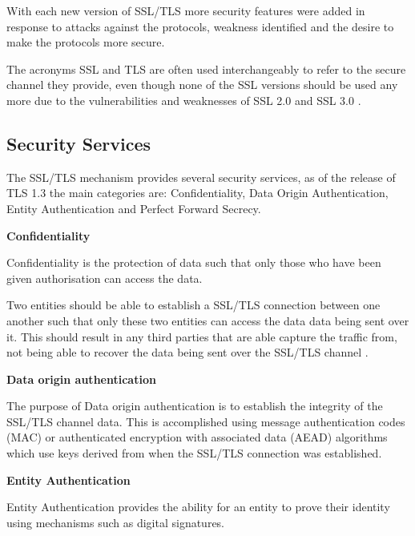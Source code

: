 \documentclass{mscreport}
\begin{document}
\vspace{0.3cm} \noindent
With each new version of SSL/TLS more security features were added in response to attacks against the protocols, weakness identified and the desire to make the protocols more secure.

\vspace{0.3cm} \noindent
The acronyms SSL and TLS are often used interchangeably to refer to the secure channel they provide, even though none of the SSL versions should be used any more due to the vulnerabilities and weaknesses of SSL 2.0 and SSL 3.0 \cite{Oppliger2016-ig}.

\subsection{Security Services}
\noindent The SSL/TLS mechanism provides several security services, as of the release of TLS 1.3 the main categories are: Confidentiality, Data Origin Authentication, Entity Authentication and Perfect Forward Secrecy.

\vspace{0.7cm} \noindent
\textbf{Confidentiality}

\noindent
Confidentiality is the protection of data such that only those who have been given authorisation can access the data.

\vspace{0.3cm} \noindent
Two entities should be able to establish a SSL/TLS connection between one another such that only these two entities can access the data data being sent over it. This should result in any third parties that are able capture the traffic from, not being able to recover the data being sent over the SSL/TLS channel \cite{Martin2017-sx}.

\vspace{0.7cm} \noindent
\textbf{Data origin authentication}

\noindent
The purpose of Data origin authentication is to establish the integrity of the SSL/TLS channel data. This is accomplished using message authentication codes (MAC)  or authenticated encryption with associated data (AEAD) algorithms \cite{Ristic2017-aj} which use keys derived from when the SSL/TLS connection was established.

\vspace{0.7cm} \noindent
\textbf{Entity Authentication}

\noindent
Entity Authentication provides the ability for an entity to prove their identity using mechanisms such as digital signatures.
\end{document}
